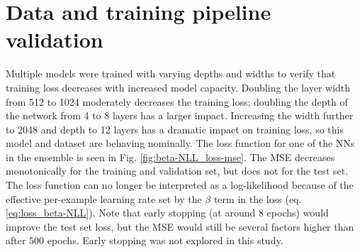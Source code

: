 \section{Data and training pipeline validation}



Multiple models were trained with varying depths and widths to verify that training loss decreases with increased model capacity. Doubling the layer width from 512 to 1024 moderately decreases the training loss; doubling the depth of the network from 4 to 8 layers has a larger impact. Increasing the width further to 2048 and depth to 12 layers has a dramatic impact on training loss, so this model and dataset are behaving nominally.
The loss function for one of the NNs in the ensemble is seen in Fig. \ref{fig:beta-NLL_loss-mse}. The MSE decreases monotonically for the training and validation set, but does not for the test set. The loss function can no longer be interpreted as a log-likelihood because of the effective per-example learning rate set by the $\beta$ term in the loss (eq. \ref{eq:loss_beta-NLL}). Note that early stopping (at around 8 epochs) would improve the test set loss, but the MSE would still be several factors higher than after 500 epochs. Early stopping was not explored in this study.


